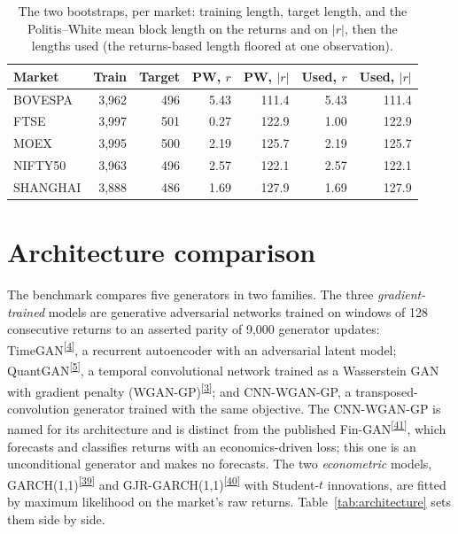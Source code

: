 \documentclass[11pt,a4paper]{article}
\makeatletter
\newcommand{\tcite}[1]{\textsuperscript{[\hyperlink{R:#1}{#1}]}}
\DeclareRobustCommand{\_}{\ifmmode\nfss@text{\textunderscore}\else\textunderscore\allowbreak\fi}
\makeatother
\begin{document}
\begin{table}[htbp]
\centering
\caption{The two bootstraps, per market: training length, target length, and the Politis--White mean block length on the returns and on $|r|$, then the lengths used (the returns-based length floored at one observation).}
\label{tab:pw}
\begin{tabular}{@{}lrrrrrr@{}}
\toprule
Market & Train & Target & PW, $r$ & PW, $|r|$ & Used, $r$ & Used, $|r|$ \\
\midrule
BOVESPA & 3,962 & 496 & 5.43 & 111.4 & 5.43 & 111.4 \\
FTSE & 3,997 & 501 & 0.27 & 122.9 & 1.00 & 122.9 \\
MOEX & 3,995 & 500 & 2.19 & 125.7 & 2.19 & 125.7 \\
NIFTY50 & 3,963 & 496 & 2.57 & 122.1 & 2.57 & 122.1 \\
SHANGHAI & 3,888 & 486 & 1.69 & 127.9 & 1.69 & 127.9 \\
\bottomrule
\end{tabular}
\end{table}

\section{Architecture comparison}
\label{sec:architecture}
The benchmark compares five generators in two families. The three \emph{gradient-trained} models are generative adversarial networks trained on windows of 128 consecutive returns to an asserted parity of 9,000 generator updates: TimeGAN\tcite{4}, a recurrent autoencoder with an adversarial latent model; QuantGAN\tcite{5}, a temporal convolutional network trained as a Wasserstein GAN with gradient penalty (WGAN-GP)\tcite{3}; and CNN-WGAN-GP, a transposed-convolution generator trained with the same objective. The CNN-WGAN-GP is named for its architecture and is distinct from the published Fin-GAN\tcite{41}, which forecasts and classifies returns with an economics-driven loss; this one is an unconditional generator and makes no forecasts. The two \emph{econometric} models, GARCH(1,1)\tcite{39} and GJR-GARCH(1,1)\tcite{40} with Student-$t$ innovations, are fitted by maximum likelihood on the market's raw returns. Table~\ref{tab:architecture} sets them side by side.
\end{document}
